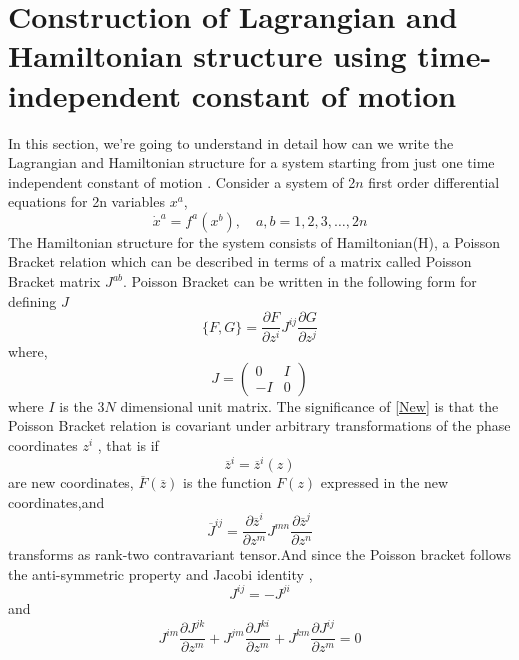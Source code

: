 \documentclass[12pt]{article}
\begin{document}
\section{Construction of Lagrangian and Hamiltonian structure using time-independent constant of motion}\label{III}
In this section, we're going to understand in detail how can we write the Lagrangian and Hamiltonian structure for a system  starting from just one time independent constant of motion \cite{hojman2014construction}.
\newline
Consider a system of 2$n$ first order differential equations for 2n variables $x^{a}$,
\begin{equation}
\dot{x}^{a}=f^{a}\left(x^{b}\right), \quad a, b=1,2,3, \ldots, 2 n
\end{equation}
The Hamiltonian structure for the system consists of Hamiltonian(H), a Poisson Bracket relation which can be described in terms of a matrix called Poisson Bracket matrix $J^{a b}$. Poisson Bracket can be written in the following form for defining $J$ \cite{goldstein1980classical}
\begin{equation}
\{F,G\}=\frac{\partial F} {\partial z^{i}} J^{i j}\frac{ \partial G}{\partial z^{j}} 
\end{equation}
where,
\begin{equation}
J=\left( \begin{array}{rr}{0} & {I} \\ {-I} & {0}\end{array}\right)
\end{equation}
where $I$ is the 3$N$ dimensional unit matrix. The significance of \eqref{New} is that the Poisson Bracket relation is covariant under arbitrary transformations of the phase coordinates $z^{i}$ \cite{article}, that is if
\begin{equation}
\overline{z}^{i}=\overline{z}^{i}(z)
\end{equation}
are new coordinates, $\overline{F}(\overline{z})$ is the function $F(z)$ expressed in the new coordinates,and
\begin{equation}
\overline{J}^{i j}=\frac{\partial \overline{z}^{i}}{\partial z^{m}}{J}^{m n}\frac{\partial \overline{z}^{j}}{\partial z^{n}}
\end{equation}
transforms as rank-two contravariant tensor.And since the Poisson bracket follows the anti-symmetric property and Jacobi identity \cite{article},
\begin{equation}
J^{i j}=-J^{j i}
\end{equation}
and
\begin{equation}
J^{i m}\frac{\partial J^{j k}}{ \partial z^{m}} + J^{j m}\frac{\partial J^{k i}}{ \partial z^{m}} + J^{k m}\frac{\partial J^{i j}}{ \partial z^{m}} = 0
\end{equation}
\end{document}
